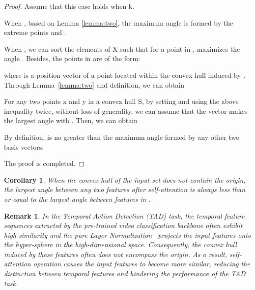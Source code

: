 \documentclass[10pt,twocolumn,letterpaper]{article}
\newtheorem{corollary}[theorem]{Corollary}
\newtheorem{proof}{Proof}[theorem]
\newtheorem{remark}{Remark}[theorem]
\begin{document}
\begin{proof}
Assume that this case holds when k.

When , based on Lemma \ref{lemma:two}, the maximum angle is formed by the extreme points  and .

When , we can sort the elements of X such that for a point  in ,  maximizes the angle . Besides, the points  in  are of the form:

where  is a position vector of a point located within the convex hull induced by . Through Lemma~\ref{lemma:two} and definition, we can obtain

For any two points x and y in a convex hull S, by setting  and using the above inequality twice, without loss of generality, we can assume that the vector  makes the largest angle with . Then, we can obtain
    

By definition,  is no greater than the maximum angle formed by any other two basis vectors.

The proof is completed.
\end{proof}

\begin{corollary}
When the convex hull of the input set  does not contain the origin, the largest angle between any two features after self-attention  is always less than or equal to the largest angle between features in .
\end{corollary}

\begin{remark}
In the Temporal Action Detection (TAD) task, the temporal feature sequences extracted by the pre-trained video classification backbone often exhibit high similarity and the pure Layer Normalization~\cite{ba2016layer} projects the input features onto the hyper-sphere in the high-dimensional space. Consequently, the convex hull induced by these features often does not encompass the origin. As a result, self-attention operation causes the input features to become more similar, reducing the distinction between temporal features and hindering the performance of the TAD task.
\end{remark}

\begin{figure*}[t]
\end{figure*}
\end{document}
